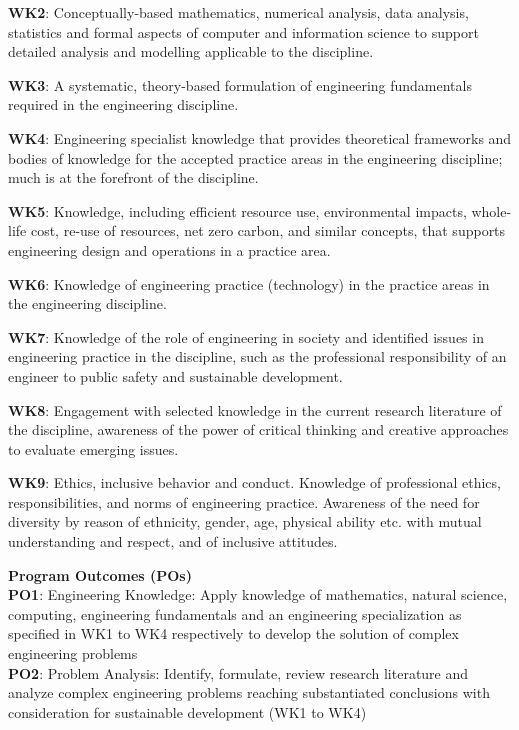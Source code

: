 \begin{titlepage}
\textbf{WK2}: Conceptually-based mathematics, numerical analysis, data analysis, statistics and formal aspects of computer and information science to support detailed analysis and modelling applicable to the discipline.

\textbf{WK3}: A systematic, theory-based formulation of engineering fundamentals required in the engineering discipline.

\textbf{WK4}: Engineering specialist knowledge that provides theoretical frameworks and bodies of knowledge for the accepted practice areas in the engineering discipline; much is at the forefront of the discipline.

\textbf{WK5}: Knowledge, including efficient resource use, environmental impacts, whole-life cost, re-use of resources, net zero carbon, and similar concepts, that supports engineering design and operations in a practice area.

\textbf{WK6}: Knowledge of engineering practice (technology) in the practice areas in the engineering discipline.

\textbf{WK7}: Knowledge of the role of engineering in society and identified issues in engineering practice in the discipline, such as the professional responsibility of an engineer to public safety and sustainable development.

\textbf{WK8}: Engagement with selected knowledge in the current research literature of the discipline, awareness of the power of critical thinking and creative approaches to evaluate emerging issues.

\textbf{WK9}: Ethics, inclusive behavior and conduct. Knowledge of professional ethics, responsibilities, and norms of engineering practice. Awareness of the need for diversity by reason of ethnicity, gender, age, physical ability etc. with mutual understanding and respect, and of inclusive attitudes.

\textbf{Program Outcomes (POs)}\\

\textbf{PO1}: Engineering Knowledge: Apply knowledge of mathematics, natural science, computing, engineering fundamentals and an engineering specialization as specified in WK1 to WK4 respectively to develop the solution of complex engineering problems\\

\textbf{PO2}: Problem Analysis: Identify, formulate, review research literature and analyze complex engineering problems reaching substantiated conclusions with consideration for sustainable development (WK1 to WK4)\\


\end{titlepage}
